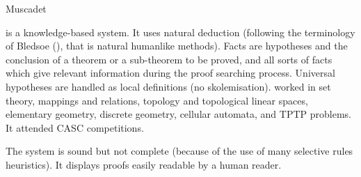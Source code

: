 \begin{entry}{Muscadet}
\begin{history}
{\sc \Muscadet} \cite{pastre:1989,pastre:1993} is a knowledge-based system.
It uses natural deduction (following the terminology of Bledsoe
 (\cite{bledsoe:71,bledsoe77}), that is natural humanlike methods).
Facts are hypotheses and the conclusion 
of a theorem or a sub-theorem to be proved,
and all sorts of facts which give relevant information
during the proof searching process.
Universal hypotheses are handled as local definitions (no skolemisation). 
\Muscadet worked in set theory, mappings and relations, topology and topological linear spaces, elementary geometry, discrete geometry, cellular automata, and TPTP problems. 
It attended CASC competitions.
\end{history}

\begin{technicalities}
The system is sound but not complete (because of the use of many selective rules heuristics).
It displays proofs easily readable by a human reader.
\end{technicalities}

\nocite{pastre:2011}

\end{entry}


